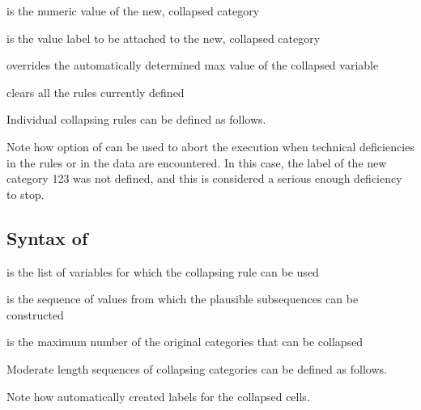 \hangpara
{} is the numeric value of the new, collapsed category

\hangpara
{} is the value label to be attached to the new, collapsed category

\hangpara
{} overrides the automatically determined max value of the collapsed variable

\hangpara
{} clears all the rules currently defined

Individual collapsing rules can be defined as follows.

\begin{stlog}
\nullskip
\end{stlog}

Note how  option of  can be used to abort the execution
when technical deficiencies in the rules or in the data are encountered. In this case,
the label of the new category 123 was not defined, and this is considered a serious
enough deficiency to stop.

\begin{stlog}
\nullskip
\end{stlog}

\subsection{Syntax of }



\hangpara
{} is the list of variables for which the collapsing rule can be used

\hangpara
{} is the sequence of values from which the plausible subsequences can be constructed

\hangpara
{} is the maximum number of the original categories that can be collapsed

Moderate length sequences of collapsing categories can be defined as follows.

\begin{stlog}
\nullskip
\end{stlog}

Note how  automatically created labels for the collapsed cells.

